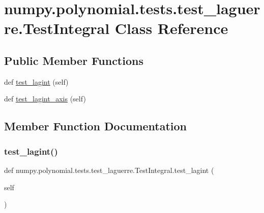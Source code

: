 \hypertarget{classnumpy_1_1polynomial_1_1tests_1_1test__laguerre_1_1TestIntegral}{}\section{numpy.\+polynomial.\+tests.\+test\+\_\+laguerre.\+Test\+Integral Class Reference}
\label{classnumpy_1_1polynomial_1_1tests_1_1test__laguerre_1_1TestIntegral}
\subsection*{Public Member Functions}
\begin{DoxyCompactItemize}
\item 
def \hyperlink{classnumpy_1_1polynomial_1_1tests_1_1test__laguerre_1_1TestIntegral_af85a3de8b9bc949d2a7359d163ce7b0c}{test\+\_\+lagint} (self)
\item 
def \hyperlink{classnumpy_1_1polynomial_1_1tests_1_1test__laguerre_1_1TestIntegral_aee31c460968b8de8673d068e06a3c226}{test\+\_\+lagint\+\_\+axis} (self)
\end{DoxyCompactItemize}


\subsection{Member Function Documentation}
\mbox{\label{classnumpy_1_1polynomial_1_1tests_1_1test__laguerre_1_1TestIntegral_af85a3de8b9bc949d2a7359d163ce7b0c}} 
\subsubsection{\texorpdfstring{test\+\_\+lagint()}{test\_lagint()}}
{\footnotesize\ttfamily def numpy.\+polynomial.\+tests.\+test\+\_\+laguerre.\+Test\+Integral.\+test\+\_\+lagint (\begin{DoxyParamCaption}\item[{}]{self }\end{DoxyParamCaption})}


